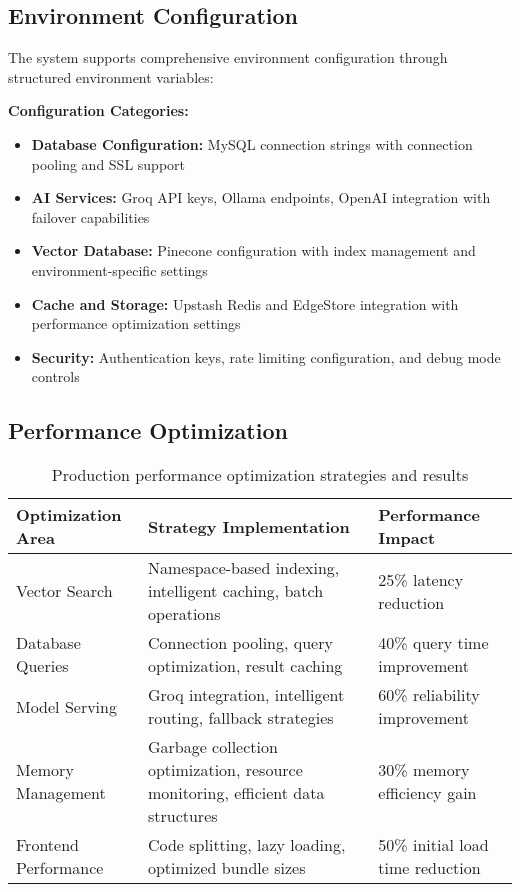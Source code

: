 \subsection{Environment Configuration}
\label{subsec:environment_config_s3}

The system supports comprehensive environment configuration through structured environment variables:

\textbf{Configuration Categories:}
\begin{itemize}
    \item \textbf{Database Configuration:} MySQL connection strings with connection pooling and SSL support
    \item \textbf{AI Services:} Groq API keys, Ollama endpoints, OpenAI integration with failover capabilities
    \item \textbf{Vector Database:} Pinecone configuration with index management and environment-specific settings
    \item \textbf{Cache and Storage:} Upstash Redis and EdgeStore integration with performance optimization settings
    \item \textbf{Security:} Authentication keys, rate limiting configuration, and debug mode controls
\end{itemize}

\subsection{Performance Optimization}
\label{subsec:performance_optimization_s3}

\begin{table}[H]
\centering
\caption{Production performance optimization strategies and results}
\label{tab:performance_optimization_s3}
\begin{tabular}{|p{4cm}|p{6cm}|p{4cm}|}
\hline
\textbf{Optimization Area} & \textbf{Strategy Implementation} & \textbf{Performance Impact} \\
\hline
Vector Search & Namespace-based indexing, intelligent caching, batch operations & 25\% latency reduction \\
\hline
Database Queries & Connection pooling, query optimization, result caching & 40\% query time improvement \\
\hline
Model Serving & Groq integration, intelligent routing, fallback strategies & 60\% reliability improvement \\
\hline
Memory Management & Garbage collection optimization, resource monitoring, efficient data structures & 30\% memory efficiency gain \\
\hline
Frontend Performance & Code splitting, lazy loading, optimized bundle sizes & 50\% initial load time reduction \\
\hline
\end{tabular}
\end{table}

